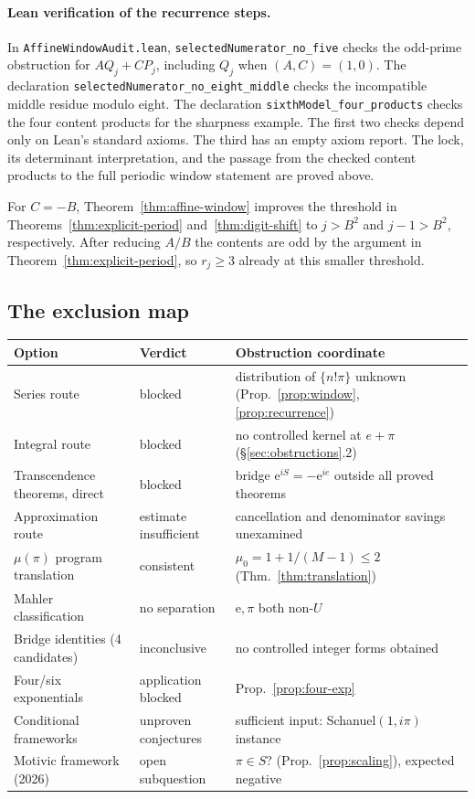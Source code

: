 \documentclass[11pt]{amsart}
\theoremstyle{definition}
\theoremstyle{remark}
\numberwithin{equation}{section}
\newcommand{\irr}{\mu}
\newcommand{\ee}{\mathrm{e}}
\begin{document}
\paragraph{Lean verification of the recurrence steps.}
In \texttt{AffineWindowAudit.lean}, \texttt{selectedNumerator\_no\_five}
checks the odd-prime obstruction for $AQ_j+CP_j$, including $Q_j$ when
$(A,C)=(1,0)$. The declaration \texttt{selectedNumerator\_no\_eight\_middle}
checks the incompatible middle residue modulo eight.
The declaration \texttt{sixthModel\_four\_products} checks the four
content products for the sharpness example. The first two checks depend
only on Lean's standard axioms. The third has an empty axiom report.
The lock, its determinant interpretation, and the passage from the
checked content products to the full periodic window statement are
proved above.

For $C=-B$, Theorem~\ref{thm:affine-window} improves the
threshold in Theorems~\ref{thm:explicit-period} and~\ref{thm:digit-shift}
to $j>B^2$ and $j-1>B^2$, respectively. After reducing $A/B$
the contents are odd by the argument in Theorem~\ref{thm:explicit-period},
so $r_j\ge3$ already at this smaller threshold.

\subsection{The exclusion map}

\begin{center}
\small\begin{tabularx}{\textwidth}{@{}p{}p{}X@{}}
\toprule
Option & Verdict & Obstruction coordinate \\
\midrule
Series route & blocked & distribution of $\{n!\pi\}$ unknown (Prop.~\ref{prop:window}, \ref{prop:recurrence}) \\
Integral route & blocked & no controlled kernel at $e+\pi$ (\S\ref{sec:obstructions}.2) \\
Transcendence theorems, direct & blocked & bridge $\ee^{iS}=-\ee^{ie}$ outside all proved theorems \\
Approximation route & estimate insufficient & cancellation and denominator savings unexamined \\
$\irr(\pi)$ program translation & consistent & $\irr_0=1+1/(M-1)\le2$ (Thm.~\ref{thm:translation}) \\
Mahler classification & no separation & $\ee,\pi$ both non-$U$ \\
Bridge identities (4 candidates) & inconclusive & no controlled integer forms obtained \\
Four/six exponentials & application blocked & Prop.~\ref{prop:four-exp} \\
Conditional frameworks & unproven conjectures & sufficient input: Schanuel$(1,i\pi)$ instance \\
Motivic framework (2026) & open subquestion & $\pi\in S$? (Prop.~\ref{prop:scaling}), expected negative \\
\bottomrule
\end{tabularx}
\end{center}
\end{document}
